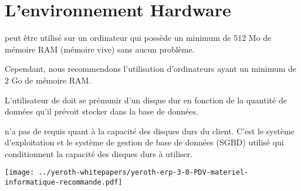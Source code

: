 \chapter{L'environnement Hardware}\label{chap:environement-materiel-requis}



\yeroth peut \^etre utilis\'e sur un ordinateur qui
poss\`ede un minimum de $512$ Mo de m\'emoire RAM
(m\'emoire vive) sans aucun probl\`eme.

Cependant, nous recommendons l'utilisation d'ordinateurs
ayant un minimum de $2$ Go de m\'emoire RAM.



L'utilisateur de \yeroth doit se pr\'emunir d'un disque
dur en fonction de la quantit\'e de donn\'ees qu'il
pr\'evoit stocker dans la base de donn\'ees.

\yeroth n'a pas de requis quant \`a la capacit\'e
des disques durs du client. C'est le syst\`eme d'exploitation
et le syst\`eme de gestion de base de donn\'ees (SGBD)
utilis\'e qui conditionnent la capacit\'e des disques
durs \`a utiliser.


\newpage


\texttt{[image: ../yeroth-whitepapers/yeroth-erp-3-0-PDV-materiel-informatique-recommande.pdf]}
